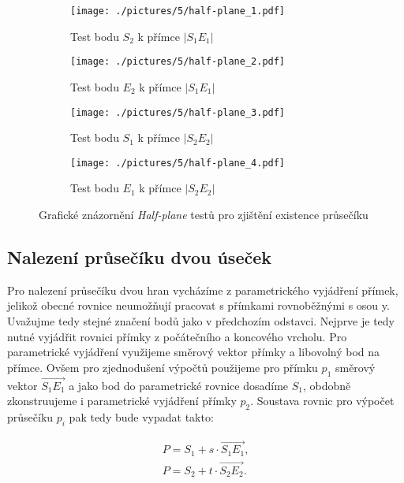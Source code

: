 \begin{figure}[h]
    \centering %
\begin{subfigure}{0.5\textwidth}
  \texttt{[image: ./pictures/5/half-plane\_1.pdf]}
  \caption{Test bodu $S_2$ k přímce $|S_1E_1|$}
  \label{fig:2-half_plane_1}
\end{subfigure}\hfil %
\begin{subfigure}{0.5\textwidth}
  \texttt{[image: ./pictures/5/half-plane\_2.pdf]}
  \caption{Test bodu $E_2$ k přímce $|S_1E_1|$}
  \label{fig:2-half_plane_2}
\end{subfigure}\hfil %

\medskip
\begin{subfigure}{0.5\textwidth}
  \texttt{[image: ./pictures/5/half-plane\_3.pdf]}
  \caption{Test bodu $S_1$ k přímce $|S_2E_2|$}
  \label{fig:2-half_plane_3}
\end{subfigure}\hfil %
\begin{subfigure}{0.5\textwidth}
  \texttt{[image: ./pictures/5/half-plane\_4.pdf]}
  \caption{Test bodu $E_1$ k přímce $|S_2E_2|$}
  \label{fig:2-half_plane_4}
\end{subfigure}\hfil %
\caption{Grafické znázornění \textit{Half-plane} testů pro zjištění existence průsečíku}
\label{fig:2-half_plane}
\end{figure}

\subsection{Nalezení průsečíku dvou úseček}
	Pro nalezení průsečíku dvou hran vycházíme z parametrického vyjádření přímek, jelikož obecné rovnice neumožňují pracovat s přímkami rovnoběžnými s osou y. Uvažujme tedy stejné značení bodů jako v předchozím odstavci. Nejprve je tedy nutné vyjádřit rovnici přímky z počátečního a koncového vrcholu. Pro parametrické vyjádření využijeme směrový vektor přímky a libovolný bod na přímce. Ovšem pro zjednodušení výpočtů použijeme pro přímku $p_1$ směrový vektor $\overrightarrow{S_1E_1}$ a jako bod do parametrické rovnice dosadíme $S_1$, obdobně zkonstruujeme i parametrické vyjádření přímky $p_2$. Soustava rovnic pro výpočet průsečíku $p_i$ pak tedy bude vypadat takto:
	
\begin{align*} 
P = S_1 + s \cdot \overrightarrow{S_1E_1}, \\
P = S_2 + t \cdot \overrightarrow{S_2E_2}. \\
\end{align*}

